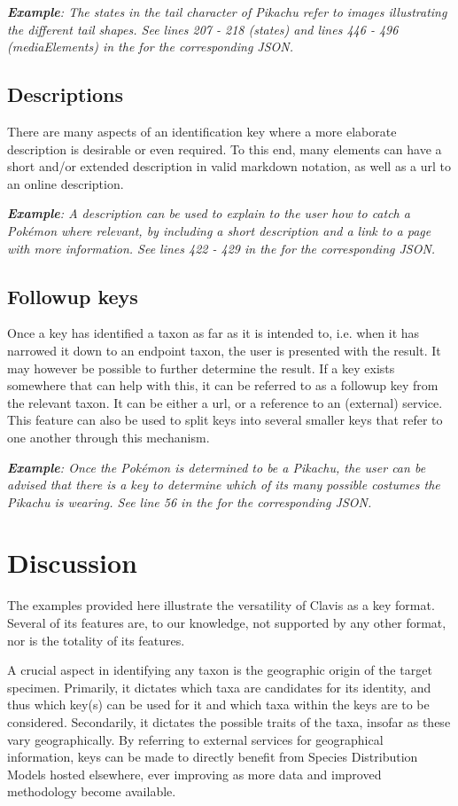 \documentclass[10pt,letterpaper]{article}
\begin{document}
\textit{\textbf{Example}: The states in the tail character of Pikachu refer to images illustrating the different tail shapes. See lines 207 - 218 (states) and lines 446 - 496 (mediaElements) in the  for the corresponding JSON.}
\subsection*{
Descriptions
}
There are many aspects of an identification key where a more elaborate description is desirable or even required. To this end, many elements can have a short and/or extended description in valid markdown notation, as well as a url to an online description.

\textit{\textbf{Example}: A description can be used to explain to the user how to catch a Pokémon where relevant, by including a short description and a link to a page with more information. See lines 422 - 429 in the  for the corresponding JSON.}
\subsection*{
Followup keys
}
Once a key has identified a taxon as far as it is intended to, i.e. when it has narrowed it down to an endpoint taxon, the user is presented with the result. It may however be possible to further determine the result. If a key exists somewhere that can help with this, it can be referred to as a followup key from the relevant taxon. It can be either a url, or a reference to an (external) service. This feature can also be used to split keys into several smaller keys that refer to one another through this mechanism.

\textit{\textbf{Example}: Once the Pokémon is determined to be a Pikachu, the user can be advised that there is a key to determine which of its many possible costumes the Pikachu is wearing. See line 56 in the  for the corresponding JSON.}

\section*{
Discussion
}
The examples provided here illustrate the versatility of Clavis as a key format. Several of its features are, to our knowledge, not supported by any other format, nor is the totality of its features.

A crucial aspect in identifying any taxon is the geographic origin of the target specimen. Primarily, it dictates which taxa are candidates for its identity, and thus which key(s) can be used for it and which taxa within the keys are to be considered. Secondarily, it dictates the possible traits of the taxa, insofar as these vary geographically. By referring to external services for geographical information, keys can be made to directly benefit from Species Distribution Models hosted elsewhere, ever improving as more data and improved methodology become available.
\end{document}
